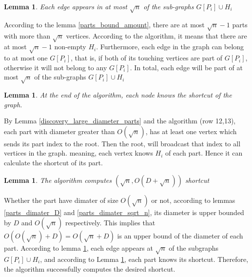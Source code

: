 \documentclass[11pt]{article}
\newtheorem{lemma}[theorem]{Lemma}
\begin{document}
\begin{lemma}
\label{edges_bound}
Each edge appears in at most $\sqrt{n}$ of the sub-graphs $G[P_i] \cup H_i$
\end{lemma}
According to the lemma \ref{parts_bound_amount}, there are at most $\sqrt{n} -1$ parts with more than $\sqrt{n}$ vertices. According to the algorithm, it means that there are at most $\sqrt{n}-1$ non-empty $H_i$. Furthermore, each edge in the graph can belong to at most one $G[P_i]$, that is, if both of its touching vertices are part of $G[P_i]$, otherwise it will not belong to any $G[P_i]$.
In total, each edge will be part of at most $\sqrt{n}$ of the sub-graphs $G[P_i] \cup H_i$


\begin{lemma}
\label{vertices_notify}
At the end of the algorithm, each node knows the shortcut of the graph.
\end{lemma}
By Lemma \ref{discovery_large_diameter_parts} and the algorithm (row 12,13), each part with diameter greater than $O(\sqrt{n})$, has at least one vertex which sends its part index to the root. Then the root, will broadcast that index to all vertices in the graph. meaning, each vertex knows $H_i$ of each part. Hence it can calculate the shortcut of its part. 


\begin{lemma} The algorithm computes $(\sqrt{n}, O(D + \sqrt{n}) )$ shortcut
\end{lemma}
Whether the part have dimater of size $O(\sqrt{n})$ or not, according to lemmas \ref{parts_dimater_D} and \ref{parts_dimater_sqrt_n}, its diameter is upper bounded by $D$ and $O(\sqrt{n})$ respectively. This implies that $O(O(\sqrt{n}) +D)=O(\sqrt{n} +D)$ is an upper bound of the diameter of each part. According to lemma \ref{edges_bound}, each edge appears at $\sqrt{n}$ of the subgraphs $G[P_i] \cup H_i$, and according to Lemma \ref{vertices_notify}, each part knows its shortcut. Therefore, the algorithm successfully computes the desired shortcut.
\end{document}
